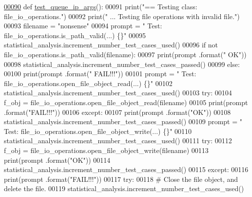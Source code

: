 \begin{DoxyCode}
\hypertarget{classutilities_1_1file__io__tester_1_1file__io__operations__tester_l00090}{}\hyperlink{classutilities_1_1file__io__tester_1_1file__io__operations__tester_aeb92655105777047c5da87ac2fe33451}{00090}     \textcolor{keyword}{def }\hyperlink{classutilities_1_1file__io__tester_1_1file__io__operations__tester_aeb92655105777047c5da87ac2fe33451}{test\_queue\_ip\_args}():
00091         print(\textcolor{stringliteral}{"==   Testing class: file\_io\_operations."})
00092         print(\textcolor{stringliteral}{" ... Testing file operations with invalid file."})
00093         filename = \textcolor{stringliteral}{"nonsense"}
00094         prompt = \textcolor{stringliteral}{"  Test: file\_io\_operations.is\_path\_valid(...) \{\}"}
00095         statistical\_analysis.increment\_number\_test\_cases\_used()
00096         \textcolor{keywordflow}{if} \textcolor{keywordflow}{not} file\_io\_operations.is\_path\_valid(filename):
00097             print(prompt .format(\textcolor{stringliteral}{"  OK"}))
00098             statistical\_analysis.increment\_number\_test\_cases\_passed()
00099         \textcolor{keywordflow}{else}:
00100             print(prompt .format(\textcolor{stringliteral}{"  FAIL!!!"}))
00101         prompt = \textcolor{stringliteral}{"  Test: file\_io\_operations.open\_file\_object\_read(...) \{\}"}
00102         statistical\_analysis.increment\_number\_test\_cases\_used()
00103         \textcolor{keywordflow}{try}:
00104             f\_obj = file\_io\_operations.open\_file\_object\_read(filename)
00105             print(prompt .format(\textcolor{stringliteral}{"FAIL!!!"}))
00106         \textcolor{keywordflow}{except}:
00107             print(prompt .format(\textcolor{stringliteral}{"OK"}))
00108             statistical\_analysis.increment\_number\_test\_cases\_passed()
00109         prompt = \textcolor{stringliteral}{"  Test: file\_io\_operations.open\_file\_object\_write(...)    \{\}"}
00110         statistical\_analysis.increment\_number\_test\_cases\_used()
00111         \textcolor{keywordflow}{try}:
00112             f\_obj = file\_io\_operations.open\_file\_object\_write(filename)
00113             print(prompt .format(\textcolor{stringliteral}{"OK"}))
00114             statistical\_analysis.increment\_number\_test\_cases\_passed()
00115         \textcolor{keywordflow}{except}:
00116             print(prompt .format(\textcolor{stringliteral}{"FAIL!!!"}))
00117         \textcolor{keywordflow}{try}:
00118             \textcolor{comment}{#   Close the file object, and delete the file.}
00119             statistical\_analysis.increment\_number\_test\_cases\_used()

\end{DoxyCode}
